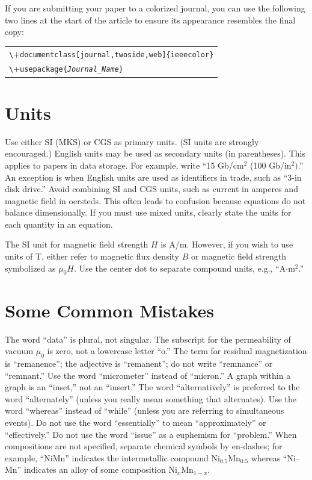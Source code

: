 \documentclass[journal,twoside,web]{ieeecolor}
\begin{document}
If you are submitting your paper to a colorized journal, you can use
the following two lines at the start of the article to ensure its
appearance resembles the final copy:

\smallskip\noindent
\begin{small}
\begin{tabular}{l}
\verb+\+\texttt{documentclass[journal,twoside,web]\{ieeecolor\}}\\
\verb+\+\texttt{usepackage\{\textit{Journal\_Name}\}}
\end{tabular}
\end{small}

\section{Units}
Use either SI (MKS) or CGS as primary units. (SI units are strongly 
encouraged.) English units may be used as secondary units (in parentheses). 
This applies to papers in data storage. For example, write ``15 
Gb/cm$^{2}$ (100 Gb/in$^{2})$.'' An exception is when 
English units are used as identifiers in trade, such as ``3\textonehalf-in 
disk drive.'' Avoid combining SI and CGS units, such as current in amperes 
and magnetic field in oersteds. This often leads to confusion because 
equations do not balance dimensionally. If you must use mixed units, clearly 
state the units for each quantity in an equation.

The SI unit for magnetic field strength $H$ is A/m. However, if you wish to use 
units of T, either refer to magnetic flux density $B$ or magnetic field 
strength symbolized as $\mu _{0}H$. Use the center dot to separate 
compound units, e.g., ``A$\cdot $m$^{2}$.''

\section{Some Common Mistakes}
The word ``data'' is plural, not singular. The subscript for the 
permeability of vacuum $\mu _{0}$ is zero, not a lowercase letter 
``o.'' The term for residual magnetization is ``remanence''; the adjective 
is ``remanent''; do not write ``remnance'' or ``remnant.'' Use the word 
``micrometer'' instead of ``micron.'' A graph within a graph is an 
``inset,'' not an ``insert.'' The word ``alternatively'' is preferred to the 
word ``alternately'' (unless you really mean something that alternates). Use 
the word ``whereas'' instead of ``while'' (unless you are referring to 
simultaneous events). Do not use the word ``essentially'' to mean 
``approximately'' or ``effectively.'' Do not use the word ``issue'' as a 
euphemism for ``problem.'' When compositions are not specified, separate 
chemical symbols by en-dashes; for example, ``NiMn'' indicates the 
intermetallic compound Ni$_{0.5}$Mn$_{0.5}$ whereas 
``Ni--Mn'' indicates an alloy of some composition 
Ni$_{x}$Mn$_{1-x}$.
\end{document}
